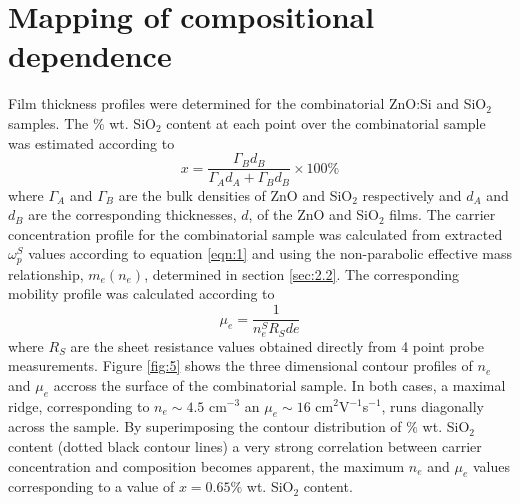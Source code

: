 \documentclass[final,5p,times]{elsarticle}
\begin{document}
\section{Mapping of compositional dependence}
\label{sec:2.3}
Film thickness profiles were determined for the combinatorial ZnO:Si and SiO$_{2}$ samples. The $\%$ wt. SiO$_{2}$ content at each point over the combinatorial sample was estimated according to
\begin{equation}
\label{eqn:8}
x = \frac{\Gamma_{B}d_{B}}{\Gamma_Ad_A+\Gamma_{B}d_{B}}\times100\%
\end{equation}
where $\Gamma_A$ and $\Gamma_B$ are the bulk densities of ZnO and SiO$_{2}$ respectively and $d_A$ and $d_B$ are the corresponding thicknesses, $d$, of the ZnO and SiO$_{2}$ films. The carrier concentration profile for the combinatorial sample was calculated from extracted $\omega_p^S$ values according to equation \ref{eqn:1} and using the non-parabolic effective mass relationship, $m_e(n_e)$, determined in section \ref{sec:2.2}. The corresponding mobility profile was calculated according to
\begin{equation}
\label{eqn:9}
\mu_e=\frac{1}{n_e^SR_Sde}
\end{equation}
where $R_S$ are the sheet resistance values obtained directly from 4 point probe measurements. Figure \ref{fig:5} shows the three dimensional contour profiles of $n_e$ and $\mu_e$ accross the surface of the combinatorial sample. In both cases, a maximal ridge, corresponding to $n_e\sim 4.5$ cm$^{-3}$ an $\mu_e \sim 16$ cm$^2$V$^{-1}$s$^{-1}$, runs diagonally across the sample. By superimposing the contour distribution of $\%$ wt. SiO$_{2}$ content (dotted black contour lines) a very strong correlation between carrier concentration and composition becomes apparent, the maximum $n_e$ and $\mu_e$ values corresponding to a value of $x=0.65\%$ wt. SiO$_{2}$ content.
\end{document}
